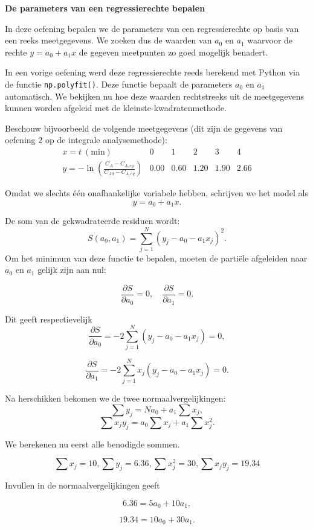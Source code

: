 \documentclass{ximera}
\begin{document}
\begin{example}
\textbf{De parameters van een regressierechte bepalen}

In deze oefening bepalen we de parameters van een regressierechte op basis van een reeks meetgegevens. We zoeken dus de waarden van \(a_0\) en \(a_1\) waarvoor de rechte $y=a_0+a_1x$ de gegeven meetpunten zo goed mogelijk benadert.

In een vorige oefening werd deze regressierechte reeds berekend met Python
via de functie \texttt{np.polyfit()}. Deze functie bepaalt de parameters
\(a_0\) en \(a_1\) automatisch. We bekijken nu hoe deze waarden rechtstreeks
uit de meetgegevens kunnen worden afgeleid met de kleinste-kwadratenmethode.

Beschouw bijvoorbeeld de volgende meetgegevens (dit zijn de gegevens van
oefening 2 op de integrale analysemethode):
\[
\begin{array}{c|ccccc}
x = t~(\mathrm{min}) &0&1&2&3&4\\
\hline
y = -\ln\left(\frac{C_A-C_{A,eq}}{C_{A0}-C_{A,eq}}\right)&0.00&0.60&1.20&1.90&2.66
\end{array}
\]


Omdat we slechts één onafhankelijke variabele hebben, schrijven we het model als
\[
y=a_0+a_1x.
\]

De som van de gekwadrateerde residuen wordt:
\[
S(a_0,a_1) = \sum_{j=1}^{N}\left(y_j-a_0-a_1x_j\right)^2.
\]
Om het minimum van deze functie te bepalen, moeten de partiële afgeleiden naar \(a_0\) en \(a_1\) gelijk zijn aan nul:

\[\frac{\partial S}{\partial a_0}=0, \quad \frac{\partial S}{\partial a_1}=0. \]

Dit geeft respectievelijk
\[
\frac{\partial S}{\partial a_0}
=
-2\sum_{j=1}^{N}(y_j-a_0-a_1x_j)=0,
\]

\[
\frac{\partial S}{\partial a_1}
=
-2\sum_{j=1}^{N}x_j(y_j-a_0-a_1x_j)=0.
\]

Na herschikken bekomen we de twee normaalvergelijkingen:
\\
\[\sum y_j = Na_0 + a_1\sum x_j,\]
\[\sum x_jy_j = a_0\sum x_j + a_1\sum x_j^2. \]

We berekenen nu eerst alle benodigde sommen.

\[
\sum x_j = 10,  
\sum y_j = 6.36, 
\sum x_j^2 = 30,
\sum x_jy_j = 19.34
\]

Invullen in de normaalvergelijkingen geeft

\[
6.36 = 5a_0 + 10a_1,
\]

\[19.34 = 10a_0 + 30a_1.
\]


\end{example}
\end{document}
